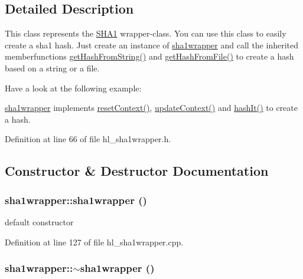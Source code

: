 \subsection{Detailed Description}
This class represents the \hyperlink{class_s_h_a1}{SHA1} wrapper-\/class. You can use this class to easily create a sha1 hash. Just create an instance of \hyperlink{classsha1wrapper}{sha1wrapper} and call the inherited memberfunctions \hyperlink{classhashwrapper_aa10904f0dc06eb54771ab26864622d0f}{getHashFromString()} and \hyperlink{classhashwrapper_ae4767e76e6d9e2b24b41f01ab9e7f03c}{getHashFromFile()} to create a hash based on a string or a file.

Have a look at the following example:


\begin{DoxyCodeInclude}
\end{DoxyCodeInclude}


\hyperlink{classsha1wrapper}{sha1wrapper} implements \hyperlink{classsha1wrapper_a8ab1d20a43a4768df03799a14cfbb6b6}{resetContext()}, \hyperlink{classsha1wrapper_af862f411a597be53682cbce6177e06e6}{updateContext()} and \hyperlink{classsha1wrapper_a88f493c77f0655eb0b8e577226c49904}{hashIt()} to create a hash. 

Definition at line 66 of file hl\_\-sha1wrapper.h.

\subsection{Constructor \& Destructor Documentation}
\hypertarget{classsha1wrapper_a7d29b64ac9de33de5e643f9ea83da537}{
\subsubsection[{sha1wrapper}]{\setlength{\rightskip}{0pt plus 5cm}sha1wrapper::sha1wrapper ()}}
\label{classsha1wrapper_a7d29b64ac9de33de5e643f9ea83da537}


default constructor 

Definition at line 127 of file hl\_\-sha1wrapper.cpp.\hypertarget{classsha1wrapper_a607cb57d97b3f5b296e1e4dee4294eba}{
\subsubsection[{$\sim$sha1wrapper}]{\setlength{\rightskip}{0pt plus 5cm}sha1wrapper::$\sim$sha1wrapper ()}}
\label{classsha1wrapper_a607cb57d97b3f5b296e1e4dee4294eba}


